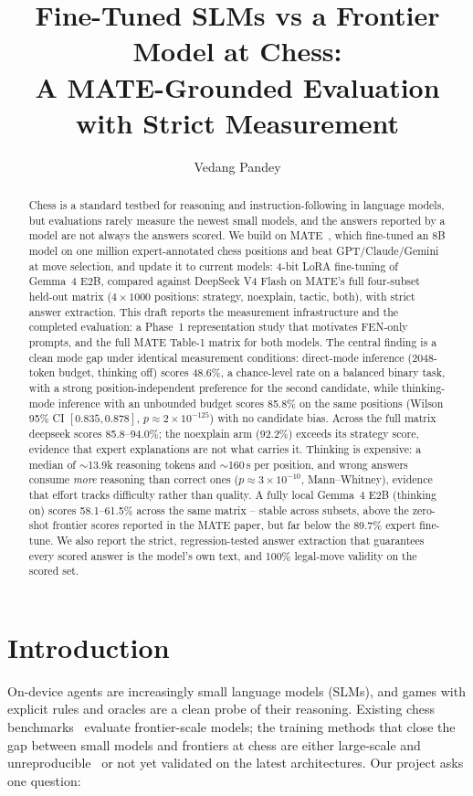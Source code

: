 \documentclass{article}
\title{Fine-Tuned SLMs vs a Frontier Model at Chess:\\
  A MATE-Grounded Evaluation with Strict Measurement}
\author{Vedang Pandey}
\date{}
\begin{document}
\maketitle

\begin{abstract}
Chess is a standard testbed for reasoning and instruction-following in
language models, but evaluations rarely measure the newest small models,
and the answers reported by a model are not always the answers scored. We
build on MATE~\cite{wang2024mate}, which fine-tuned an 8B model on one
million expert-annotated chess positions and beat GPT/Claude/Gemini at
move selection, and update it to current models: 4-bit LoRA fine-tuning
of Gemma~4 E2B, compared against DeepSeek V4 Flash on MATE's full
four-subset held-out matrix ($4\times1000$ positions: strategy,
noexplain, tactic, both), with strict answer extraction. This draft
reports the measurement infrastructure and the completed evaluation: a
Phase~1 representation study that motivates FEN-only prompts, and the
full MATE Table-1 matrix for both models. The central finding is a clean
mode gap under identical measurement conditions: direct-mode inference
(2048-token budget, thinking off) scores 48.6\%, a chance-level rate on
a balanced binary task, with a strong position-independent preference
for the second candidate, while thinking-mode inference with an
unbounded budget scores 85.8\% on the same positions (Wilson 95\% CI
$[0.835,0.878]$, $p\approx 2\times10^{-125}$) with no candidate bias.
Across the full matrix deepseek scores 85.8--94.0\%; the noexplain arm
(92.2\%) exceeds its strategy score, evidence that expert explanations
are not what carries it. Thinking is expensive: a median of
$\sim$13.9k reasoning tokens and $\sim$160\,s per position, and wrong
answers consume \emph{more} reasoning than correct ones
($p\approx 3\times10^{-10}$, Mann--Whitney), evidence that effort
tracks difficulty rather than quality. A fully local Gemma~4 E2B
(thinking on) scores 58.1--61.5\% across the same matrix -- stable
across subsets, above the zero-shot frontier scores reported in the
MATE paper, but far below the 89.7\% expert fine-tune. We also report
the strict, regression-tested answer extraction that guarantees every
scored answer is the model's own text, and 100\% legal-move validity
on the scored set.
\end{abstract}

\section{Introduction}
On-device agents are increasingly small language models (SLMs), and
games with explicit rules and oracles are a clean probe of their
reasoning. Existing chess benchmarks~\cite{ruoss2024chessbench,kolasani2025llmchess,wen2025chessqa}
evaluate frontier-scale models; the training methods that close the gap
between small models and frontiers at chess are either large-scale and
unreproducible~\cite{feng2023chessgpt} or not yet validated on the
latest architectures. Our project asks one question:
\end{document}

